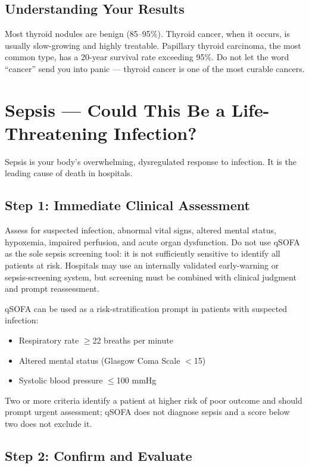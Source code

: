 \subsection{Understanding Your Results}

Most thyroid nodules are benign (85--95\%). Thyroid cancer, when it occurs, is usually slow-growing and highly treatable. Papillary thyroid carcinoma, the most common type, has a 20-year survival rate exceeding 95\%. Do not let the word ``cancer'' send you into panic --- thyroid cancer is one of the most curable cancers.

\clearpage
\section{Sepsis --- Could This Be a Life-Threatening Infection?}

Sepsis is your body's overwhelming, dysregulated response to infection. It is the leading cause of death in hospitals.

\subsection{Step 1: Immediate Clinical Assessment}

Assess for suspected infection, abnormal vital signs, altered mental status, hypoxemia, impaired perfusion, and acute organ dysfunction. Do not use qSOFA as the sole sepsis screening tool: it is not sufficiently sensitive to identify all patients at risk. Hospitals may use an internally validated early-warning or sepsis-screening system, but screening must be combined with clinical judgment and prompt reassessment.

qSOFA can be used as a risk-stratification prompt in patients with suspected infection:
\begin{itemize}
    \item Respiratory rate $\geq$22 breaths per minute
    \item Altered mental status (Glasgow Coma Scale $<$15)
    \item Systolic blood pressure $\leq$100 mmHg
\end{itemize}

Two or more criteria identify a patient at higher risk of poor outcome and should prompt urgent assessment; qSOFA does not diagnose sepsis and a score below two does not exclude it.

\subsection{Step 2: Confirm and Evaluate}

